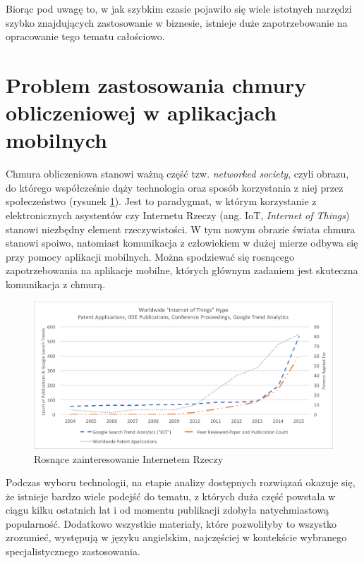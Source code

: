\documentclass[12pt,a4paper,twoside,titlepage,openright]{book}
\begin{document}
Biorąc pod uwagę to, w jak szybkim czasie pojawiło się wiele istotnych narzędzi szybko znajdujących zastosowanie w biznesie, istnieje duże zapotrzebowanie na opracowanie tego tematu całościowo. 

\section*{Problem zastosowania chmury obliczeniowej w aplikacjach mobilnych}

Chmura obliczeniowa stanowi ważną część tzw. \textit{networked society}, czyli obrazu, do którego współcześnie dąży technologia oraz sposób korzystania z niej przez społeczeństwo (rysunek \ref{fig:iot-hype}). Jest to paradygmat, w którym korzystanie z elektronicznych asystentów czy Internetu Rzeczy (ang. IoT, \textit{Internet of Things}) stanowi niezbędny element rzeczywistości.\cite{ccSpringer} W tym nowym obrazie świata chmura stanowi spoiwo, natomiast komunikacja z człowiekiem w dużej mierze odbywa się przy pomocy aplikacji mobilnych. Można spodziewać się rosnącego zapotrzebowania na aplikacje mobilne, których głównym zadaniem jest skuteczna komunikacja z chmurą. 

\begin{figure}[h]
	\centering
			\includegraphics[width=\textwidth]{iot-hype.png}
		\caption{Rosnące zainteresowanie Internetem Rzeczy \cite{iotArchitects}}
		\label{fig:iot-hype}
\end{figure}

Podczas wyboru technologii, na etapie analizy dostępnych rozwiązań okazuje się, że istnieje bardzo wiele podejść do tematu, z których duża część powstała w ciągu kilku ostatnich lat i od momentu publikacji zdobyła natychmiastową popularność. Dodatkowo wszystkie materiały, które pozwoliłyby to wszystko zrozumieć, występują w języku angielskim, najczęściej w kontekście wybranego specjalistycznego zastosowania. 
\end{document}
